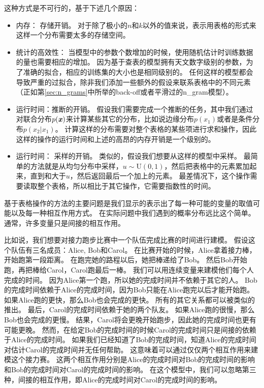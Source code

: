 这种方式是不可行的，基于下述几个原因：
\begin{itemize}
	\item 内存： 存储开销。
	对于除了极小的$n$和$k$以外的值来说，表示用表格的形式来这样一个分布需要太多的存储空间。
	
	
	\item  统计的高效性： 当模型中的参数个数增加的时候，使用随机估计时训练数据的量也需要相应的增加。
	因为基于查表的模型拥有天文数字级别的参数，为了准确的拟合，相应的训练集的大小也是相同级别的。
	任何这样的模型都会导致严重的过拟合，除非我们添加一些额外的假设来联系表格中的不同元素（正如第\ref{sec:n_grams}中所举的back-off或者平滑过的\gls{n_gram}模型）。
	
	\item 运行时间：推断的开销。
	假设我们需要完成一个推断的任务，其中我们通过对联合分布$p(\boldsymbol{\mathit{x}})$来计算某些其它的分布，比如说边缘分布$p(x_1)$或者是条件分布$p(x_2\vert x_1)$。
	计算这样的分布需要对整个表格的某些项进行求和操作，因此这样的操作的运行时间和上述的高昂的内存开销是一个级别的。
	
	
	\item 运行时间： 采样的开销。
	类似的，假设我们想要从这样的模型中采样。
	最简单的方法就是从均匀分布中采样，$u\sim \text{U}(0,1)$，然后把表格中的元素累加起来，直到和大于$u$，然后返回最后一个加上的元素。
	最差情况下，这个操作需要读取整个表格，所以相比于其它操作，它需要指数性的时间。
\end{itemize}



基于表格操作的方法的主要问题是我们显示的表示出了每一种可能的变量的取值可能以及每一种相互作用方式。
在实际问题中我们遇到的概率分布远比这个简单。
通常，许多变量只是间接的相互作用。


比如说，我们想要对接力跑步比赛中一个队伍完成比赛的时间进行建模。
假设这个队伍有三名成员：Alice, Bob和Carol。
在比赛开始的时候，Alice拿着接力棒，开始跑第一段距离。
在跑完她的路程以后，她把棒递给了Bob。
然后Bob开始跑，再把棒给Carol，Carol跑最后一棒。
我们可以用连续变量来建模他们每个人完成的时间。
因为Alice第一个跑，所以她的完成时间并不依赖于其它的人。
Bob的完成时间依赖于Alice的完成时间，因为Bob只能在Alice跑完以后才能开始跑。
如果Alice跑的更快，那么Bob也会完成的更快。
所有的其它关系都可以被类似的推出。
最后，Carol的完成时间依赖于她的两个队友。
如果Alice跑的很慢，那么Bob也会完成的更慢。
结果，Carol将会更晚开始跑步，因此她的完成时间也更有可能更晚。
然而，在给定Bob的完成时间的时候Carol的完成时间只是间接的依赖于Alice的完成时间。
如果我们已经知道了Bob的完成时间，知道Alice的完成时间对估计Carol的完成时间并无任何帮助。
这意味着可以通过仅仅两个相互作用来建模这个接力赛。
这两个相互作用分别是Alice的完成时间对Bob的完成时间的影响和Bob的完成时间对Carol的完成时间的影响。
在这个模型中，我们可以忽略第三种，间接的相互作用，即Alice的完成时间对Carol的完成时间的影响。



